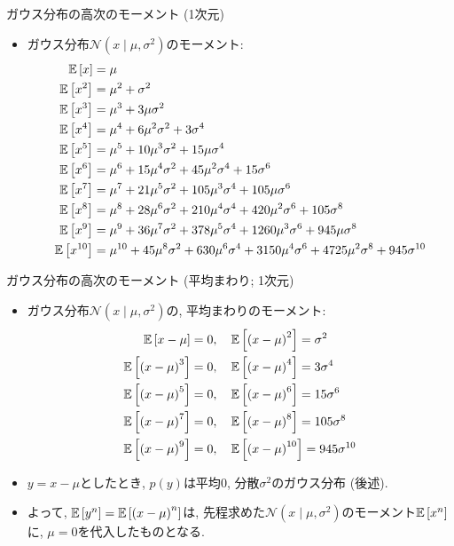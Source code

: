 \documentclass[dvipdfmx,notheorems,t]{beamer}
\begin{document}
\begin{frame}{ガウス分布の高次のモーメント (1次元)}
\begin{itemize}
  \item ガウス分布$\mathcal{N}(x \mid \mu, \sigma^2)$のモーメント:
  \begin{align*}
    \operatorname{\mathbb{E}} \left[ x \right] &= \mu \\
    \operatorname{\mathbb{E}} \left[ x^2 \right] &= \mu^2 + \sigma^2 \\
    \operatorname{\mathbb{E}} \left[ x^3 \right] &= \mu^3 + 3 \mu \sigma^2 \\
    \operatorname{\mathbb{E}} \left[ x^4 \right] &= \mu^4 + 6 \mu^2 \sigma^2 + 3 \sigma^4 \\
    \operatorname{\mathbb{E}} \left[ x^5 \right] &= \mu^5 + 10 \mu^3 \sigma^2 + 15 \mu \sigma^4 \\
    \operatorname{\mathbb{E}} \left[ x^6 \right] &= \mu^6 + 15 \mu^4 \sigma^2 + 45 \mu^2 \sigma^4
      + 15 \sigma^6 \\
    \operatorname{\mathbb{E}} \left[ x^7 \right] &= \mu^7 + 21 \mu^5 \sigma^2 + 105 \mu^3 \sigma^4
      + 105 \mu \sigma^6 \\
    \operatorname{\mathbb{E}} \left[ x^8 \right] &= \mu^8 + 28 \mu^6 \sigma^2 + 210 \mu^4 \sigma^4
      + 420 \mu^2 \sigma^6 + 105 \sigma^8 \\
    \operatorname{\mathbb{E}} \left[ x^9 \right] &= \mu^9 + 36 \mu^7 \sigma^2 + 378 \mu^5 \sigma^4
      + 1260 \mu^3 \sigma^6 + 945 \mu \sigma^8 \\
    \operatorname{\mathbb{E}} \left[ x^{10} \right] &= \mu^{10} + 45 \mu^8 \sigma^2 + 630 \mu^6 \sigma^4
      + 3150 \mu^4 \sigma^6 + 4725 \mu^2 \sigma^8 + 945 \sigma^{10}
  \end{align*}
\end{itemize}
\end{frame}

\begin{frame}{ガウス分布の高次のモーメント (平均まわり; 1次元)}
\begin{itemize}
  \item ガウス分布$\mathcal{N}(x \mid \mu, \sigma^2)$の, 平均まわりのモーメント:
  \begin{align*}
    \operatorname{\mathbb{E}} \left[ x - \mu \right] = 0, \quad &
    \operatorname{\mathbb{E}} \left[ \left( x - \mu \right)^2 \right] = \sigma^2 \\
    \operatorname{\mathbb{E}} \left[ \left( x - \mu \right)^3 \right] = 0, \quad &
    \operatorname{\mathbb{E}} \left[ \left( x - \mu \right)^4 \right] = 3 \sigma^4 \\
    \operatorname{\mathbb{E}} \left[ \left( x - \mu \right)^5 \right] = 0, \quad &
    \operatorname{\mathbb{E}} \left[ \left( x - \mu \right)^6 \right] = 15 \sigma^6 \\
    \operatorname{\mathbb{E}} \left[ \left( x - \mu \right)^7 \right] = 0, \quad &
    \operatorname{\mathbb{E}} \left[ \left( x - \mu \right)^8 \right] = 105 \sigma^8 \\
    \operatorname{\mathbb{E}} \left[ \left( x - \mu \right)^9 \right] = 0, \quad &
    \operatorname{\mathbb{E}} \left[ \left( x - \mu \right)^{10} \right] = 945 \sigma^{10}
  \end{align*}
  \item $y = x - \mu$としたとき, $p(y)$は平均$0$, 分散$\sigma^2$のガウス分布 (後述).
  \item よって, $\operatorname{\mathbb{E}} \left[ y^n \right] = \operatorname{\mathbb{E}} \left[ \left( x - \mu \right)^n \right]$は,
  先程求めた$\mathcal{N}(x \mid \mu, \sigma^2)$のモーメント$\operatorname{\mathbb{E}} \left[ x^n \right]$に, $\mu = 0$を代入したものとなる.
\end{itemize}
\end{frame}
\end{document}
